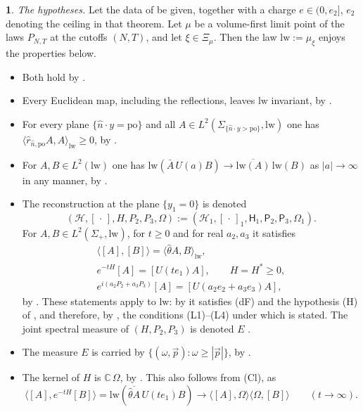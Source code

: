 \documentclass[11pt]{amsart}
\newcommand{\namedhead}{}
\theoremstyle{definition}
\newtheorem*{namedinner}{\namedhead}
\newenvironment{named}[1]{\renewcommand{\namedhead}{#1}\begin{namedinner}}{\end{namedinner}}
\begin{document}
\begin{named}{Proposition 3.1}
\emph{The hypotheses.}
Let the data of \cite[Theorem~44]{QEDIII} be given, together with a charge $e\in(0,e_2]$, $e_2$ denoting the ceiling in that theorem.
Let $\mu$ be a volume-first limit point of the laws $P_{N,T}$ at the cutoffs $(N,T)$, and let $\xi\in\Xi_\mu$.
Then the law $\mathrm{lw}:=\mu_\xi$ enjoys the properties below.
\begin{itemize}
\item[(G), (dF)] Both hold by \cite[Theorem~44\,(D1)]{QEDIII}.
\item[(Inv)] Every Euclidean map, including the reflections, leaves $\mathrm{lw}$ invariant, by \cite[Theorem~44\,(D2) with (C2)]{QEDIII}.
\item[(RP)] For every plane $\{\hat n\cdot y=\mathrm{po}\}$ and all $A\in L^2(\Sigma_{\{\hat n\cdot y>\mathrm{po}\}},\mathrm{lw})$ one has $\langle\hat r_{\hat n,\mathrm{po}}A,A\rangle_{\mathrm{lw}}\ge0$, by \cite[Theorem~44\,(D2) with (C3)]{QEDIII}.
\item[(Cl)] For $A,B\in L^2(\mathrm{lw})$ one has $\mathrm{lw}(\bar A\,\allowbreak U(a)B)\to\overline{\mathrm{lw}(A)}\,\allowbreak \mathrm{lw}(B)$ as $|a|\to\infty$ in any manner, by \cite[Theorem~44\,(D4)]{QEDIII}.
\item[(Rec)] The reconstruction at the plane $\{y_1=0\}$ is denoted
\begin{equation*}
(\mathcal H,[\,\cdot\,],H,P_2,P_3,\Omega):=(\mathcal H_1,[\,\cdot\,]_1,\mathsf H_1,\mathsf P_2,\mathsf P_3,\Omega_1).
\end{equation*}
For $A,B\in L^2(\Sigma_+,\mathrm{lw})$, for $t\ge0$ and for real $a_2,a_3$ it satisfies
\begin{gather*}
\langle[A],[B]\rangle=\langle\hat\theta A,B\rangle_{\mathrm{lw}},\\
e^{-tH}[A]=[U(te_1)A],\qquad H=H^*\ge0,\\
e^{i(a_2P_2+a_3P_3)}[A]=[U(a_2e_2+a_3e_3)A],
\end{gather*}
by \cite[(n4), (n8), Proposition~45.3\,(1), (2), (5)]{QEDIII}.
These statements apply to $\mathrm{lw}$: by \cite[Theorem~44\,(D1)]{QEDIII} it satisfies (dF) and the hypothesis (H) of \cite[(n3)]{QEDIII}, and therefore, by \cite[Proposition~45.1\,(10)]{QEDIII}, the conditions (L1)--(L4) under which \cite[Proposition~45.3]{QEDIII} is stated.
The joint spectral measure of $(H,P_2,P_3)$ is denoted $E$ \cite[Lemma~12.18\,(b)]{QEDII}.
\item[(Sp)] The measure $E$ is carried by $\{(\omega,\vec p):\omega\ge|\vec p|\}$, by \cite[Theorem~44\,(D2) with (C4)]{QEDIII}.
\item[(Vac)] The kernel of $H$ is $\mathbb C\,\Omega$, by \cite[Theorem~44\,(D3)]{QEDIII}.
This also follows from (Cl), as
\begin{equation*}
\langle[A],e^{-tH}[B]\rangle=\mathrm{lw}(\overline{\hat\theta A}\,U(te_1)B)\to\langle[A],\Omega\rangle\langle\Omega,[B]\rangle\qquad(t\to\infty).
\end{equation*}
\end{itemize}
\end{named}
\end{document}
